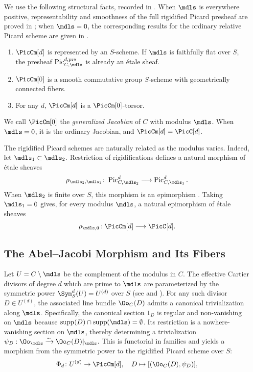 We use the following structural facts, recorded in
\cite[\S3, fundamental properties (1)--(4)]{takeuchi2018blow}. When $\mdls$ is everywhere
positive, representability and smoothness of the full rigidified Picard
presheaf are proved in \cite[Proposition~4.8]{Guignard2018}; when
$\mdls=0$, the corresponding results for the ordinary relative Picard
scheme are given in \cite[\S9.3, Theorem~1]{BLR1990}.
\begin{enumerate}
    \item $\PicCm[d]$ is represented by an $S$-scheme. If $\mdls$ is
    faithfully flat over $S$, the presheaf
    $\operatorname{Pic}_{C,\mdls}^{d,\mathrm{pre}}$ is already an \'etale
    sheaf.
    \item $\PicCm[0]$ is a smooth commutative group $S$-scheme with
    geometrically connected fibers.
    \item For any $d$, $\PicCm[d]$ is a $\PicCm[0]$-torsor.
\end{enumerate}
We call $\PicCm[0]$ the \emph{generalized Jacobian} of $C$ with modulus
$\mdls$. When $\mdls=0$, it is the ordinary Jacobian, and
$\PicCm[d]=\PicC[d]$.

The rigidified Picard schemes are naturally related as the modulus varies.
Indeed, let $\mdls_1\subset\mdls_2$. Restriction of rigidifications defines
a natural morphism of \'etale sheaves
\[
\rho_{\mdls_2,\mdls_1}\colon
\operatorname{Pic}_{C,\mdls_2}^d
\longrightarrow
\operatorname{Pic}_{C,\mdls_1}^d.
\]
When $\mdls_2$ is finite over $S$, this morphism is an epimorphism
\cite[\S3]{takeuchi2018blow}.
Taking $\mdls_1=0$ gives, for every
modulus $\mdls$, a natural epimorphism of \'etale sheaves
\[
\rho_{\mdls,0}\colon \PicCm[d]\longrightarrow\PicC[d].
\]

\subsection*{The Abel--Jacobi Morphism and Its Fibers}\label{section:AbelJacobi}


Let $U = C \setminus \mdls$ be the complement of the modulus in $C$.
The effective Cartier divisors of degree $d$ which are prime to $\mdls$ are parameterized by the symmetric power $\Sym_S^d (U) = U^{(d)}$ over $S$ (see \cite[Proposition~4.12]{Guignard2018} and \cite[Chapter~III, Theorem~3.13]{milneAV}).
For any such divisor $D \in U^{(d)}$, the associated line bundle $\Oo_C(D)$ admits a canonical trivialization along $\mdls$.
Specifically, the canonical section $1_D$ is regular and non-vanishing on $\mdls$ because $\operatorname{supp}(D) \cap \operatorname{supp}(\mdls) = \emptyset$.
Its restriction is a nowhere-vanishing section on $\mdls$, thereby
determining a trivialization
$\psi_D:\Oo_{\mdls}\xrightarrow{\sim}\Oo_C(D)|_{\mdls}$.
This is functorial in families and yields a morphism from the symmetric power
to the rigidified Picard scheme over $S$:
\begin{equation}
    \Phi_d\colon U^{(d)} \to \PicCm[d], \quad D \mapsto [(\Oo_C(D), \psi_D)],
\end{equation}

